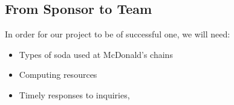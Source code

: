 \documentclass[12pt,letterpaper]{article}
\theoremstyle{definition}
\begin{document}
\subsection{From Sponsor to Team} %

In order for our project to be of successful one, we will need:
\begin{itemize}
    \item Types of soda used at McDonald's chains
    \item Computing resources
    \item Timely responses to inquiries, 
\end{itemize}


%
%
\end{document}
